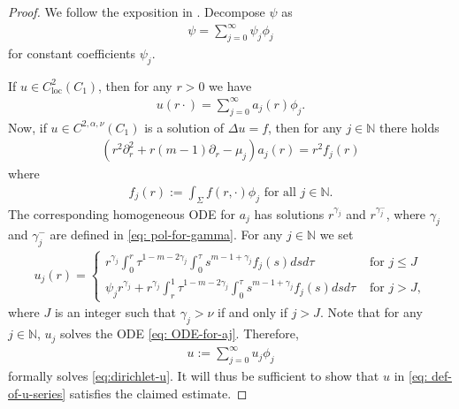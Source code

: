 \documentclass[11pt]{amsart}
\theoremstyle{definition}
\theoremstyle{remark}
\begin{document}
\begin{proof}
We follow the exposition in \cite[Section 3]{SN91}.
    Decompose $\psi$ as
    \begin{align*}
        \psi=\sum_{j=0}^\infty\psi_j\phi_j
    \end{align*}
    for constant coefficients $\psi_j$.
    
    If $u\in C^2_{\text{loc}}(C_1)$, then for any $r>0$ we have
    \begin{align*}
        u(r\cdot)=\sum_{j=0}^\infty a_j(r)\phi_j.
    \end{align*}
    Now, if $u\in C^{2,\alpha,\nu}(C_1)$ is a solution of $\Delta u=f$, then for any $j\in \mathbb{N}$ there holds
    \begin{align}\label{eq: ODE-for-aj}
        (r^2\partial_r^2+r(m-1)\partial_r-\mu_j)a_j(r)=r^2f_j(r)
    \end{align}
    where
    \begin{align*}
        f_j(r):=\int_\Sigma f(r,\cdot)\phi_j\text{ for all }j\in \mathbb{N}.
    \end{align*}
    The corresponding homogeneous ODE for $a_j$ has solutions $r^{\gamma_j}$ and $r^{\gamma_j^-}$, where $\gamma_j$ and $\gamma_j^-$ are defined in \eqref{eq: pol-for-gamma}.
    For any $j\in \mathbb{N}$ we set
    \begin{align*}
        u_j(r)=\begin{cases}
            r^{\gamma_j}\int_0^r\tau^{1-m-2\gamma_j}\int_0^\tau s^{m-1+\gamma_j}f_j(s)dsd\tau&\text{ for }j\leq J \\
            \psi_j r^{\gamma_j}+r^{\gamma_j}\int_r^1\tau^{1-m-2\gamma_j}\int_0^\tau s^{m-1+\gamma_j}f_j(s)dsd\tau&\text{ for }j> J,
        \end{cases}
    \end{align*}
    where $J$ is an integer such that $\gamma_j>\nu$ if and only if $j> J$. Note that for any $j\in \mathbb{N}$, $u_j$ solves the ODE \eqref{eq: ODE-for-aj}. Therefore,
    \begin{align}\label{eq: def-of-u-series}
        u:=\sum_{j=0}^\infty u_j\phi_j
    \end{align}
    formally solves \eqref{eq:dirichlet-u}. It will thus be sufficient to show that $u$ in \eqref{eq: def-of-u-series} satisfies the claimed estimate.
    

\end{proof}
\end{document}
